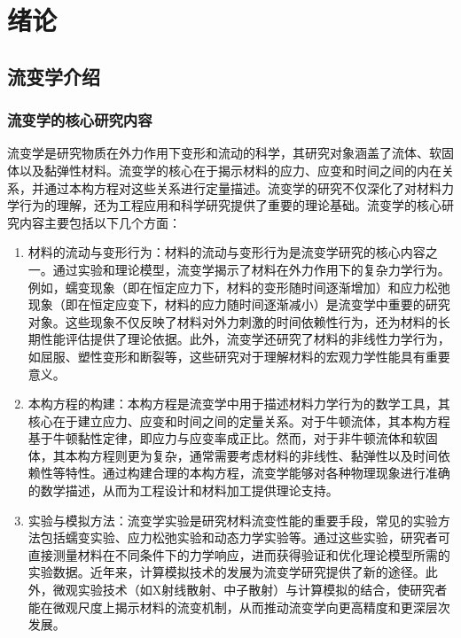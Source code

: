 \chapter{绪论}

\section{流变学介绍}
\subsection{流变学的核心研究内容}
流变学是研究物质在外力作用下变形和流动的科学，其研究对象涵盖了流体、软固体以及黏弹性材料\cite{dealyIntroductionRheology1990}。流变学的核心在于揭示材料的应力、应变和时间之间的内在关系，并通过本构方程对这些关系进行定量描述。流变学的研究不仅深化了对材料力学行为的理解，还为工程应用和科学研究提供了重要的理论基础。流变学的核心研究内容主要包括以下几个方面\cite{elleroTanner90Years2024,ewoldtDesigningComplexFluids2022}：
\begin{enumerate}[topsep = 0 pt, itemsep= 0 pt, parsep=0pt, partopsep=0pt, leftmargin=0pt, itemindent=44pt, labelsep=6pt, label=(\arabic*)]
  \item 材料的流动与变形行为：材料的流动与变形行为是流变学研究的核心内容之一。通过实验和理论模型，流变学揭示了材料在外力作用下的复杂力学行为。例如，蠕变现象（即在恒定应力下，材料的变形随时间逐渐增加）和应力松弛现象（即在恒定应变下，材料的应力随时间逐渐减小）是流变学中重要的研究对象\cite{BARNES19971,banerjeeRoleRheologyMorphology2023}。这些现象不仅反映了材料对外力刺激的时间依赖性行为，还为材料的长期性能评估提供了理论依据。此外，流变学还研究了材料的非线性力学行为，如屈服、塑性变形和断裂等，这些研究对于理解材料的宏观力学性能具有重要意义\cite{zenerElasticityAnelasticityMetals1949,hajikarimiViscoelasticityTheoreticalBackground2023}。
  \item	  本构方程的构建：本构方程是流变学中用于描述材料力学行为的数学工具，其核心在于建立应力、应变和时间之间的定量关系。对于牛顿流体，其本构方程基于牛顿黏性定律，即应力与应变率成正比\cite{elleroTanner90Years2024}。然而，对于非牛顿流体和软固体，其本构方程则更为复杂，通常需要考虑材料的非线性、黏弹性以及时间依赖性等特性\cite{sunReviewConstitutiveModels2024}。通过构建合理的本构方程，流变学能够对各种物理现象进行准确的数学描述，从而为工程设计和材料加工提供理论支持。
  \item  实验与模拟方法：流变学实验是研究材料流变性能的重要手段，常见的实验方法包括蠕变实验、应力松弛实验和动态力学实验等\cite{ewoldtDesigningComplexFluids2022}。通过这些实验，研究者可直接测量材料在不同条件下的力学响应，进而获得验证和优化理论模型所需的实验数据。近年来，计算模拟技术的发展为流变学研究提供了新的途径。此外，微观实验技术（如X射线散射、中子散射）与计算模拟的结合，使研究者能在微观尺度上揭示材料的流变机制，从而推动流变学向更高精度和更深层次发展\cite{kuschelNonlinearEnhancementUltrafast2025,sun2022relaxation}。
\end{enumerate}
